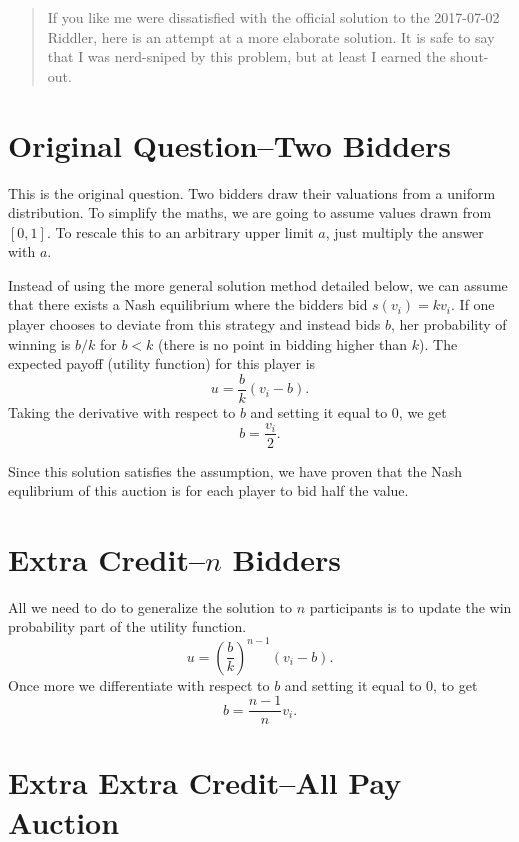 \documentclass[12pt]{article}
\begin{document}
\maketitle

\begin{abstract}
If you like me were dissatisfied with the official solution to the 2017-07-02 Riddler, here is an attempt at a more elaborate solution. It is safe to say that I was nerd-sniped by this problem, but at least I earned the shout-out.
\end{abstract}

\section{Original Question--Two Bidders}

This is the original question. Two bidders draw their valuations from a uniform distribution. To simplify the maths, we are going to assume values drawn from $[0, 1]$. To rescale this to an arbitrary upper limit $a$, just multiply the answer with $a$.

Instead of using the more general solution method detailed below, we can assume that there exists a Nash equilibrium where the bidders bid $s(v_i) = kv_i$. If one player chooses to deviate from this strategy and instead bids $b$, her probability of winning is $b/k$ for $b<k$ (there is no point in bidding higher than $k$). The expected payoff (utility function) for this player is
$$
u = \frac{b}{k}(v_i - b).
$$
Taking the derivative with respect to $b$ and setting it equal to 0, we get
$$
b = \frac{v_i}{2}.
$$

Since this solution satisfies the assumption, we have proven that the Nash equlibrium of this auction is for each player to bid half the value.

\section{Extra Credit--$n$ Bidders}

All we need to do to generalize the solution to $n$ participants is to update the win probability part of the utility function.
$$
u = \left(\frac{b}{k}\right)^{n-1}(v_i - b).
$$
Once more we differentiate with respect to $b$ and setting it equal to 0, to get
$$
b = \frac{n-1}{n}v_i.
$$

\section{Extra Extra Credit--All Pay Auction}
\end{document}
